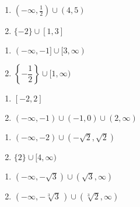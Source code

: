 \documentclass{ximera}
\begin{document}
\begin{multicols}{2}
\begin{enumerate}
\setcounter{enumi}{\value{HW}}

\item $(-\infty, \frac{1}{2}) \cup (4, 5)$
\item $\{-2\} \cup [1, 3]$

\setcounter{HW}{\value{enumi}}
\end{enumerate}
\end{multicols}

\begin{multicols}{2}
\begin{enumerate}
\setcounter{enumi}{\value{HW}}

\item $(-\infty, -1] \cup [3, \infty)$

\item $\left\{ -\dfrac{1}{2} \right\} \cup [1, \infty)$

\setcounter{HW}{\value{enumi}}
\end{enumerate}
\end{multicols}

\begin{multicols}{2}
\begin{enumerate}
\setcounter{enumi}{\value{HW}}

\item $[-2,2]$
\item $\left(-\infty, -1 \right) \cup \left(-1, 0 \right) \cup (2, \infty)$

\setcounter{HW}{\value{enumi}}
\end{enumerate}
\end{multicols}

\begin{multicols}{2}
\begin{enumerate}
\setcounter{enumi}{\value{HW}}


\item $(-\infty, -2) \cup \left(-\sqrt{2}, \sqrt{2} \right)$
\item $\{2 \} \cup [4,\infty)$

\setcounter{HW}{\value{enumi}}
\end{enumerate}
\end{multicols}

\begin{multicols}{2}
\begin{enumerate}
\setcounter{enumi}{\value{HW}}


\item $(-\infty, -\sqrt{3}) \cup (\sqrt{3}, \infty)$
\item $(-\infty, -\sqrt[3]{3}\,) \cup (\sqrt[3]{2}, \infty)$

\setcounter{HW}{\value{enumi}}
\end{enumerate}
\end{multicols}
\end{document}
